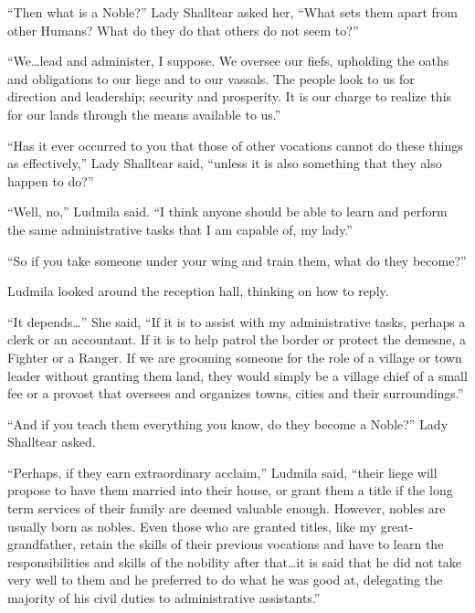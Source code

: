  

“Then what is a Noble?” Lady Shalltear asked her, “What sets them apart from other Humans? What do they do that others do not seem to?”

 

“We…lead and administer, I suppose. We oversee our fiefs, upholding the oaths and obligations to our liege and to our vassals. The people look to us for direction and leadership; security and prosperity. It is our charge to realize this for our lands through the means available to us.”

 

“Has it ever occurred to you that those of other vocations cannot do these things as effectively,” Lady Shalltear said, “unless it is also something that they also happen to do?”

 

“Well, no,” Ludmila said. “I think anyone should be able to learn and perform the same administrative tasks that I am capable of, my lady.”

 

“So if you take someone under your wing and train them, what do they become?”

 

Ludmila looked around the reception hall, thinking on how to reply.

 

“It depends…” She said, “If it is to assist with my administrative tasks, perhaps a clerk or an accountant. If it is to help patrol the border or protect the demesne, a Fighter or a Ranger. If we are grooming someone for the role of a village or town leader without granting them land, they would simply be a village chief of a small fee or a provost that oversees and organizes towns, cities and their surroundings.”

 

“And if you teach them everything you know, do they become a Noble?” Lady Shalltear asked.

 

“Perhaps, if they earn extraordinary acclaim,” Ludmila said, “their liege will propose to have them married into their house, or grant them a title if the long term services of their family are deemed valuable enough. However, nobles are usually born as nobles. Even those who are granted titles, like my great-grandfather, retain the skills of their previous vocations and have to learn the responsibilities and skills of the nobility after that…it is said that he did not take very well to them and he preferred to do what he was good at, delegating the majority of his civil duties to administrative assistants.”

